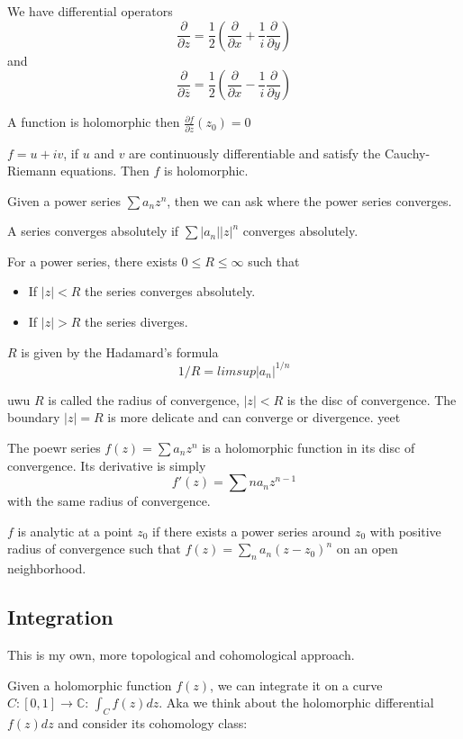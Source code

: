 \documentclass[main.tex]{subfiles}
\begin{document}
We have differential operators
$$
\frac{\partial}{\partial z} = \frac{1}{2} (\frac{\partial}{\partial x} + \frac{1}{i}\frac{\partial}{\partial y})
$$
and 
$$
\frac{\partial}{\partial \overline{z}} = \frac{1}{2} (\frac{\partial}{\partial x} - \frac{1}{i}\frac{\partial}{\partial y})
$$

A function is holomorphic then $\frac{\partial f}{\partial \overline{z}}(z_0) = 0$

\begin{theorem}
$f = u + iv$, if $u$ and $v$ are continuously differentiable and satisfy the Cauchy-Riemann equations. Then $f$ is holomorphic.
\end{theorem}

Given a power series $\sum a_n z^n$, then we can ask where the power series converges.

A series converges absolutely if $\sum|a_n||z|^n $ converges absolutely.

\begin{theorem}
For a power series, there exists $0 \leq R \leq \infty$ such that 
\begin{itemize}
    \item If $|z| < R$ the series converges absolutely.
    \item If $|z| > R$ the series diverges.
\end{itemize}
$R$ is given by the Hadamard's formula 
$$
1/R = lim sup |a_n|^{1/n}
$$
\end{theorem}
uwu
$R$ is called the radius of convergence, $|z| < R$ is the disc of convergence. The boundary $|z| = R$ is more delicate and can converge or divergence. yeet

\begin{theorem}
The poewr series $f(z) = \sum a_n z^n$ is a holomorphic function in its disc of convergence. Its derivative is simply 
$$
f'(z) = \sum n a_n z^{n-1}
$$
with the same radius of convergence.
\end{theorem}

$f$ is analytic at a point $z_0$ if there exists a power series around $z_0$ with positive radius of convergence such that $f(z) = \sum_n a_n (z - z_0)^n$ on an open neighborhood. 




\subsection{Integration}
\begin{remark}
This is my own, more topological and cohomological approach.
\end{remark}
Given a holomorphic function $f(z)$, we can integrate it on a curve $C: [0,1] \rightarrow \mathbb{C}$: $\int_C f(z) dz$. Aka we think about the holomorphic differential $f(z) dz$ and consider its cohomology class:
\end{document}
